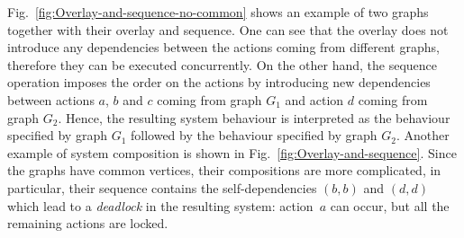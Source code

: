 Fig.~\ref{fig:Overlay-and-sequence-no-common} shows an example of
two graphs together with their overlay and sequence. One can see that
the overlay does not introduce any dependencies between the actions
coming from different graphs, therefore they can be executed concurrently.
On the other hand, the sequence operation imposes the order on the
actions by introducing new dependencies between actions $a$, $b$
and $c$ coming from graph $G_{1}$ and action $d$ coming from graph
$G_{2}$. Hence, the resulting system behaviour is interpreted as
the behaviour specified by graph $G_{1}$ followed by the behaviour
specified by graph $G_{2}$. Another example of system composition
is shown in Fig.~\ref{fig:Overlay-and-sequence}. Since the graphs
have common vertices, their compositions are more complicated, in
particular, their sequence contains the self-dependencies $(b,b)$
and $(d,d)$ which lead to a \emph{deadlock} in the resulting system:
action~$a$ can occur, but all the remaining actions are locked.



